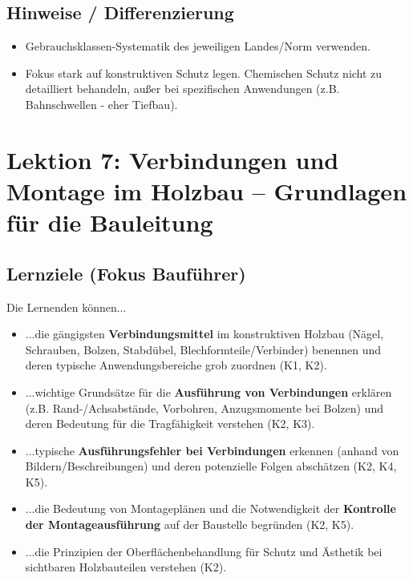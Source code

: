 \documentclass[12pt, a4paper]{article}
\begin{document}
\subsection{Hinweise / Differenzierung}
\begin{itemize}
    \item Gebrauchsklassen-Systematik des jeweiligen Landes/Norm verwenden.
    \item Fokus stark auf konstruktiven Schutz legen. Chemischen Schutz nicht zu detailliert behandeln, außer bei spezifischen Anwendungen (z.B. Bahnschwellen - eher Tiefbau).
\end{itemize}

\newpage

\section{Lektion 7: Verbindungen und Montage im Holzbau – Grundlagen für die Bauleitung}
\subsection{Lernziele (Fokus Bauführer)}
Die Lernenden können...
\begin{itemize}
    \item ...die gängigsten \textbf{Verbindungsmittel} im konstruktiven Holzbau (Nägel, Schrauben, Bolzen, Stabdübel, Blechformteile/Verbinder) benennen und deren typische Anwendungsbereiche grob zuordnen (K1, K2).
    \item ...wichtige Grundsätze für die \textbf{Ausführung von Verbindungen} erklären (z.B. Rand-/Achsabstände, Vorbohren, Anzugsmomente bei Bolzen) und deren Bedeutung für die Tragfähigkeit verstehen (K2, K3).
    \item ...typische \textbf{Ausführungsfehler bei Verbindungen} erkennen (anhand von Bildern/Beschreibungen) und deren potenzielle Folgen abschätzen (K2, K4, K5).
    \item ...die Bedeutung von Montageplänen und die Notwendigkeit der \textbf{Kontrolle der Montageausführung} auf der Baustelle begründen (K2, K5).
    \item ...die Prinzipien der Oberflächenbehandlung für Schutz und Ästhetik bei sichtbaren Holzbauteilen verstehen (K2).
\end{itemize}
\end{document}
